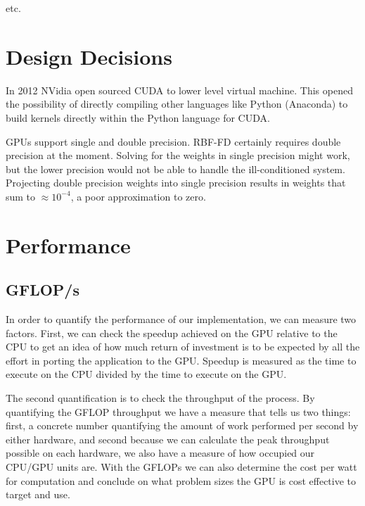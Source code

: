 \documentclass{report}
\begin{document}

 



\cite{Bell2009} 
\cite{Vuduc2005} etc. 



\section{Design Decisions}

In 2012 NVidia open sourced CUDA to lower level virtual machine. This opened the possibility of directly compiling other languages like Python (Anaconda) to build kernels directly within the Python language for CUDA. 

GPUs support single and double precision. RBF-FD certainly requires double precision at the moment. Solving for the weights in single precision might work, but the lower precision would not be able to handle the ill-conditioned system. Projecting double precision weights into single precision results in weights that sum to $\approx 10^{-4}$, a poor approximation to zero. 


\section{Performance}
\subsection{GFLOP/s}
In order to quantify the performance of our implementation, we can measure two
factors. First, we can check the speedup achieved on the GPU relative to the
CPU to get an idea of how much return of investment is to be expected by all
the effort in porting the application to the GPU. Speedup is measured as the
time to execute on the CPU divided by the time to execute on the GPU. 

The second quantification is to check the throughput of the process. By
quantifying the GFLOP throughput we have a measure that tells us two things:
first, a concrete number quantifying the amount of work performed per second by
either hardware, and second because we can calculate the peak throughput possible on
each hardware, we also have a measure of how occupied our CPU/GPU units are.
With the GFLOPs we can also determine the cost per watt for computation and
conclude on what problem sizes the GPU is cost effective to target and use. 
\end{document}
